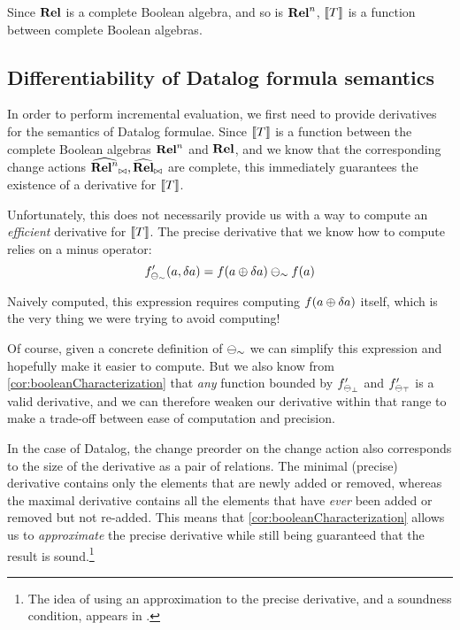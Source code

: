 Since $\mathbf{Rel}$ is a complete Boolean algebra, and so is $\mathbf{Rel}^n$, $\llbracket T \rrbracket$ is
a function between complete Boolean algebras.

\subsection{Differentiability of Datalog formula semantics}
\label{sec:datalogDifferentiability}

In order to perform incremental evaluation, we first need to provide derivatives for the semantics
of Datalog formulae. Since $\llbracket T \rrbracket$ is a function between the complete Boolean algebras $\mathbf{Rel}^n$ and
$\mathbf{Rel}$, and we know that the corresponding change actions 
$\widehat{\mathbf{Rel}^n}_{\bowtie}, \widehat{\mathbf{Rel}}_{\bowtie}$
are complete, this immediately guarantees the existence of a derivative for $\llbracket T \rrbracket$.

Unfortunately, this does not necessarily provide us with a way to compute an \emph{efficient} 
derivative for $\llbracket T \rrbracket$. The precise derivative that we know how to compute relies on
a minus operator:
\begin{displaymath}
  f'_{\ominus_\sim}(a, \delta a) = f(a \oplus \delta a) \ominus_\sim f(a)
\end{displaymath}

Naively computed, this expression requires computing $f(a \oplus \delta a)$
itself, which is the very thing we were trying to avoid computing!

Of course, given a concrete definition of $\ominus_\sim$ we can simplify this
expression and hopefully make it easier to compute. But we also know from
\cref{cor:booleanCharacterization} that \emph{any} function bounded by
$f'_{\ominus_\bot}$ and $f'_{\ominus_\top}$ is a valid derivative,
and we can therefore weaken our derivative within that range to make a 
trade-off between ease of computation and precision.

In the case of Datalog, the change preorder on the change action also
corresponds to the size of the derivative as a pair of relations. The minimal (precise)
derivative contains only the elements that are newly added or removed,
whereas the maximal derivative contains all the elements that have \emph{ever}
been added or removed but not re-added. This means that \cref{cor:booleanCharacterization} allows
us to \emph{approximate} the precise derivative while still being
guaranteed that the result is sound.\footnote{The idea of using an approximation
to the precise derivative, and a soundness condition, appears in \textcite{bancilhon1986amateur}.}


